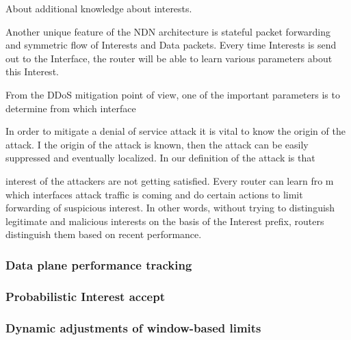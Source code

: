 About additional knowledge about interests.  

Another unique feature of the NDN architecture is stateful packet forwarding~\cite{adaptive-forwarding} and symmetric flow of Interests and Data packets.  Every time Interests is send out to the Interface, the router will be able to learn various parameters about this Interest.


From the DDoS mitigation point of view, one of the important parameters is to determine from which interface


In order to mitigate a denial of service attack it is vital to know the origin of the attack.  I the origin of the attack is known, then the attack can be easily suppressed and eventually localized.  In our definition of the attack is that 

interest of the attackers are not getting satisfied. 
Every router can learn fro m which interfaces attack traffic is coming and do certain actions to limit forwarding of suspicious interest.   In other words, without trying to distinguish legitimate and malicious interests on the basis of the Interest prefix, routers distinguish them based on recent performance.



\subsubsection{Data plane performance tracking}
\label{sec:stats}




\subsubsection{Probabilistic Interest accept}
\label{sec:probabilistic}




\subsubsection{Dynamic adjustments of window-based limits}
\label{sec:dynamic limits}



